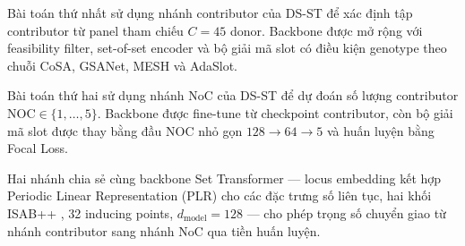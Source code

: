 \documentclass[12pt,a4paper]{article}
\begin{document}
Bài toán thứ nhất sử dụng nhánh contributor của DS-ST để xác định tập contributor từ panel tham chiếu $C=45$ donor. Backbone được mở rộng với feasibility filter, set-of-set encoder và bộ giải mã slot có điều kiện genotype theo chuỗi CoSA, GSANet, MESH và AdaSlot.

Bài toán thứ hai sử dụng nhánh NoC của DS-ST để dự đoán số lượng contributor $\mathrm{NOC}\in\{1,\ldots,5\}$. Backbone được fine-tune từ checkpoint contributor, còn bộ giải mã slot được thay bằng đầu NOC nhỏ gọn $128\to64\to5$ và huấn luyện bằng Focal Loss.

Hai nhánh chia sẻ cùng backbone Set Transformer — locus embedding kết hợp Periodic Linear Representation (PLR) \cite{gorishniy2022} cho các đặc trưng số liên tục, hai khối ISAB++ \cite{lee2019}, 32 inducing points, $d_{\mathrm{model}}=128$ — cho phép trọng số chuyển giao từ nhánh contributor sang nhánh NoC qua tiền huấn luyện.
\end{document}
